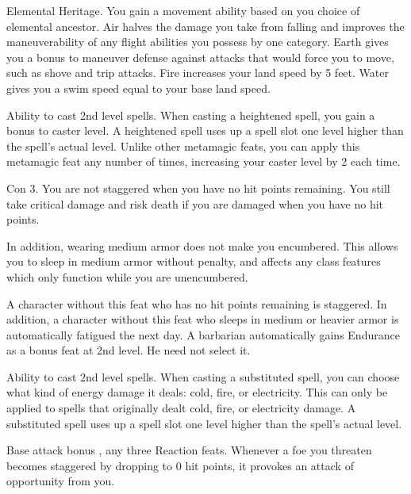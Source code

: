 \featpre Elemental Heritage.
\featben You gain a movement ability based on you choice of elemental ancestor. Air halves the damage you take from falling and improves the maneuverability of any flight abilities you possess by one category. Earth gives you a  bonus to maneuver defense against attacks that would force you to move, such as shove and trip attacks. Fire increases your land speed by 5 feet. Water gives you a swim speed equal to your base land speed.

 Ability to cast 2nd level spells.
 When casting a heightened spell, you gain a  bonus to caster level. A heightened spell uses up a spell slot one level higher than the spell's actual level. Unlike other metamagic feats, you can apply this metamagic feat any number of times, increasing your caster level by 2 each time.

\featpre Con 3.
 You are not staggered when you have no hit points remaining. You still take critical damage and risk death if you are damaged when you have no hit points.

In addition, wearing medium armor does not make you encumbered. This allows you to sleep in medium armor without penalty, and affects any class features which only function while you are unencumbered.

 A character without this feat who has no hit points remaining is staggered. In addition, a character without this feat who sleeps in medium or heavier armor is automatically fatigued the next day.
 A barbarian automatically gains Endurance as a bonus feat at 2nd level. He need not select it.

 Ability to cast 2nd level spells.
 When casting a substituted spell, you can choose what kind of energy damage it deals: cold, fire, or electricity. This can only be applied to spells that originally dealt cold, fire, or electricity damage. A substituted spell uses up a spell slot one level higher than the spell's actual level.

 Base attack bonus , any three Reaction feats.
 Whenever a foe you threaten becomes staggered by dropping to 0 hit points, it provokes an attack of opportunity from you.

